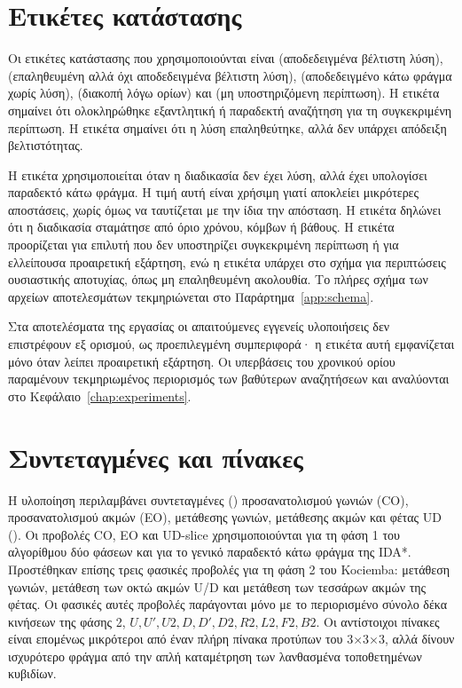 \section{Ετικέτες κατάστασης}
\label{sec:implementation-status}
Οι ετικέτες κατάστασης που χρησιμοποιούνται είναι  (αποδεδειγμένα βέλτιστη λύση),  (επαληθευμένη αλλά όχι αποδεδειγμένα βέλτιστη λύση),  (αποδεδειγμένο κάτω φράγμα χωρίς λύση),  (διακοπή λόγω ορίων) και  (μη υποστηριζόμενη περίπτωση). Η ετικέτα  σημαίνει ότι ολοκληρώθηκε εξαντλητική ή παραδεκτή αναζήτηση για τη συγκεκριμένη περίπτωση. Η ετικέτα  σημαίνει ότι η λύση επαληθεύτηκε, αλλά δεν υπάρχει απόδειξη βελτιστότητας.

Η ετικέτα  χρησιμοποιείται όταν η διαδικασία δεν έχει λύση, αλλά έχει υπολογίσει παραδεκτό κάτω φράγμα. Η τιμή αυτή είναι χρήσιμη γιατί αποκλείει μικρότερες αποστάσεις, χωρίς όμως να ταυτίζεται με την ίδια την απόσταση. Η ετικέτα  δηλώνει ότι η διαδικασία σταμάτησε από όριο χρόνου, κόμβων ή βάθους. Η ετικέτα  προορίζεται για επιλυτή που δεν υποστηρίζει συγκεκριμένη περίπτωση ή για ελλείπουσα προαιρετική εξάρτηση, ενώ η ετικέτα  υπάρχει στο σχήμα για περιπτώσεις ουσιαστικής αποτυχίας, όπως μη επαληθευμένη ακολουθία. Το πλήρες σχήμα των αρχείων αποτελεσμάτων τεκμηριώνεται στο Παράρτημα~\ref{app:schema}.

Στα αποτελέσματα της εργασίας οι απαιτούμενες εγγενείς υλοποιήσεις δεν επιστρέφουν  εξ ορισμού, ως προεπιλεγμένη συμπεριφορά· η ετικέτα αυτή εμφανίζεται μόνο όταν λείπει προαιρετική εξάρτηση. Οι υπερβάσεις του χρονικού ορίου παραμένουν τεκμηριωμένος περιορισμός των βαθύτερων αναζητήσεων και αναλύονται στο Κεφάλαιο~\ref{chap:experiments}.

\section{Συντεταγμένες και πίνακες}
\label{sec:implementation-tables}
Η υλοποίηση περιλαμβάνει συντεταγμένες () προσανατολισμού γωνιών (CO), προσανατολισμού ακμών (EO), μετάθεσης γωνιών, μετάθεσης ακμών και φέτας UD (). Οι προβολές CO, EO και UD-slice χρησιμοποιούνται για τη φάση 1 του αλγορίθμου δύο φάσεων και για το γενικό παραδεκτό κάτω φράγμα της IDA*. Προστέθηκαν επίσης τρεις φασικές προβολές για τη φάση 2 του Kociemba: μετάθεση γωνιών, μετάθεση των οκτώ ακμών U/D και μετάθεση των τεσσάρων ακμών της φέτας. Οι φασικές αυτές προβολές παράγονται μόνο με το περιορισμένο σύνολο δέκα κινήσεων της φάσης 2, \(U,U',U2,D,D',D2,R2,L2,F2,B2\). Οι αντίστοιχοι πίνακες είναι επομένως μικρότεροι από έναν πλήρη πίνακα προτύπων του 3×3×3, αλλά δίνουν ισχυρότερο φράγμα από την απλή καταμέτρηση των λανθασμένα τοποθετημένων κυβιδίων.

